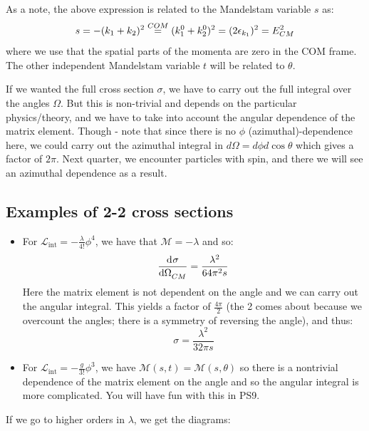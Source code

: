 As a note, the above expression is related to the Mandelstam variable $s$ as:
\begin{equation}
    s = -(k_1 + k_2)^2 \stackrel{COM}{=} (k_1^0 + k_2^0)^2 = (2\epsilon_{k_1})^2 = E_{CM}^2
\end{equation}
where we use that the spatial parts of the momenta are zero in the COM frame. The other independent Mandelstam variable $t$ will be related to $\theta$. 

If we wanted the full cross section $\sigma$, we have to carry out the full integral over the angles $\Omega$. But this is non-trivial and depends on the particular physics/theory, and we have to take into account the angular dependence of the matrix element. Though - note that since there is no $\phi$ (azimuthal)-dependence here, we could carry out the azimuthal integral in $d\Omega = d\phi d\cos\theta$ which gives a factor of $2\pi$. Next quarter, we encounter particles with spin, and there we will see an azimuthal dependence as a result.

\subsection{Examples of 2-2 cross sections}
\begin{itemize}
    \item For $\mathcal{L}_{\text{int}} = -\frac{\lambda}{4!}\phi^4$, we have that $\mathcal{M} = -\lambda$ and so:
    \begin{equation}
        \dod{\sigma}{\Omega_{CM}} = \frac{\lambda^2}{64\pi^2 s}
    \end{equation}
    Here the matrix element is not dependent on the angle and we can carry out the angular integral. This yields a factor of $\frac{4\pi}{2}$ (the 2 comes about because we overcount the angles; there is a symmetry of reversing the angle), and thus:
    \begin{equation}
        \sigma = \frac{\lambda^2}{32\pi s}
    \end{equation}
    \item For $\mathcal{L}_{\text{int}} = -\frac{g}{3!}\phi^3$, we have $\mathcal{M}(s, t) = \mathcal{M}(s, \theta)$ so there is a nontrivial dependence of the matrix element on the angle and so the angular integral is more complicated. You will have fun with this in PS9.
\end{itemize}

If we go to higher orders in $\lambda$, we get the diagrams:

